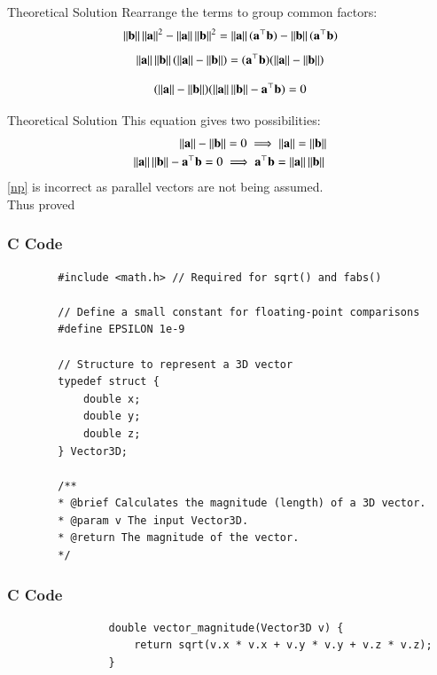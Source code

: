 \documentclass{beamer}
\begin{document}
	\begin{frame}{Theoretical Solution}
		Rearrange the terms to group common factors:
		\begin{align}
			\left\lVert\mathbf{b}\right\rVert\left\lVert\mathbf{a}\right\rVert^2 - \left\lVert\mathbf{a}\right\rVert\left\lVert\mathbf{b}\right\rVert^2 = \left\lVert\mathbf{a}\right\rVert(\mathbf{a}^\top\mathbf{b}) - \left\lVert\mathbf{b}\right\rVert(\mathbf{a}^\top\mathbf{b})
		\end{align}
		\begin{align}
			\left\lVert\mathbf{a}\right\rVert\left\lVert\mathbf{b}\right\rVert (\left\lVert\mathbf{a}\right\rVert - \left\lVert\mathbf{b}\right\rVert) = (\mathbf{a}^\top\mathbf{b}) (\left\lVert\mathbf{a}\right\rVert - \left\lVert\mathbf{b}\right\rVert)
		\end{align}
		
		\begin{align}
			(\left\lVert\mathbf{a}\right\rVert - \left\lVert\mathbf{b}\right\rVert) (\left\lVert\mathbf{a}\right\rVert\left\lVert\mathbf{b}\right\rVert - \mathbf{a}^\top\mathbf{b}) = 0
		\end{align}
		
	\end{frame}
	\begin{frame}{Theoretical Solution}
		This equation gives two possibilities:
		\begin{align}
			\left\lVert\mathbf{a}\right\rVert - \left\lVert\mathbf{b}\right\rVert = 0 \implies \left\lVert\mathbf{a}\right\rVert = \left\lVert\mathbf{b}\right\rVert\\
			\left\lVert\mathbf{a}\right\rVert\left\lVert\mathbf{b}\right\rVert - \mathbf{a}^\top\mathbf{b} = 0 \implies \mathbf{a}^\top\mathbf{b} = \left\lVert\mathbf{a}\right\rVert\left\lVert\mathbf{b}\right\rVert\text{} \label{np}
		\end{align}
		\eqref{np} is incorrect as parallel vectors are not being assumed.\\
		Thus proved
	\end{frame}
	\begin{frame}[fragile]
		\frametitle{C Code }
		
		\begin{lstlisting}
		#include <math.h> // Required for sqrt() and fabs()
		
		// Define a small constant for floating-point comparisons
		#define EPSILON 1e-9
		
		// Structure to represent a 3D vector
		typedef struct {
			double x;
			double y;
			double z;
		} Vector3D;
		
		/**
		* @brief Calculates the magnitude (length) of a 3D vector.
		* @param v The input Vector3D.
		* @return The magnitude of the vector.
		*/
			\end{lstlisting}
		\end{frame}
		\begin{frame}[fragile]
			\frametitle{C Code }
			
			\begin{lstlisting}
				double vector_magnitude(Vector3D v) {
					return sqrt(v.x * v.x + v.y * v.y + v.z * v.z);
				}
				
				
				
			\end{lstlisting}
		\end{frame}
\end{document}
